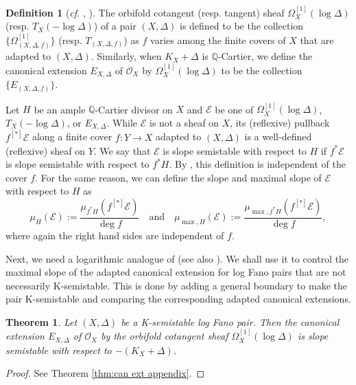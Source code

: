 \documentclass[12pt]{amsart}
\newtheorem{thm}[prop]{Theorem}
\theoremstyle{definition}
\newtheorem{defn}[prop]{Definition}
\newcommand{\bQ}{\mathbb{Q}}
\newcommand{\cO}{\mathcal{O}}
\newcommand{\cE}{\mathcal{E}}
\numberwithin{equation}{section}
\begin{document}
\begin{defn}[{\emph{cf.} \cite[Definition 2.23]{GT-orbifold-stab}, \cite[Example 2.21]{Dai-MY}}] \label{def:orbifold slope}
The orbifold cotangent (resp. tangent) sheaf $\Omega^{[1]}_X(\log \Delta)$ (resp. $T_X(-\log \Delta)$) of a pair $(X,\Delta)$ is defined to be the collection $\{\Omega^{[1]}_{(X,\Delta,f)}\}$ (resp. $T_{(X,\Delta,f)}$) as $f$ varies among the finite covers of $X$ that are adapted to $(X,\Delta)$. Similarly, when $K_X+\Delta$ is $\bQ$-Cartier, we define the canonical extension $E_{X,\Delta}$ of $\cO_X$ by $\Omega^{[1]}_X(\log \Delta)$ to be the collection $\{E_{(X,\Delta,f)}\}$. 

Let $H$ be an ample $\bQ$-Cartier divisor on $X$ and $\cE$ be one of $\Omega^{[1]}_X(\log \Delta)$, $T_X(-\log \Delta)$, or $E_{X,\Delta}$. While $\cE$ is not a sheaf on $X$, its (reflexive) pullback $f^{[*]}\cE$ along a finite cover $f\colon Y\to X$ adapted to $(X,\Delta)$ is a well-defined (reflexive) sheaf on $Y$. We say that $\cE$ is slope semistable with respect to $H$ if $f^*\cE$ is slope semistable with respect to $f^*H$. By \cite[Lemma 3.2.2]{HL-book-sheaf}, this definition is independent of the cover $f$. For the same reason, we can define the slope and maximal slope of $\cE$ with respect to $H$ as
\[
\mu_{H}(\cE):=\frac{\mu_{f^*H}(f^{[*]}\cE)}{\deg f}\quad \mathrm{and}\quad\mu_{\max,H}(\cE):=\frac{\mu_{\max,f^*H}(f^{[*]}\cE)}{\deg f},
\]
where again the right hand sides are independent of $f$.
\end{defn}

Next, we need a logarithmic analogue of \cite{DGP-Q-Fano-decomp} (see also \cite{Li-extension-stab,Dai-stability}). We shall use it to control the maximal slope of the adapted canonical extension for log Fano pairs that are not necessarily K-semistable. This is done by adding a general boundary to make the pair K-semistable and comparing the corresponding adapted canonical extensions. 

\begin{thm} \label{thm:can ext ss}
Let $(X,\Delta)$ be a K-semistable log Fano pair. Then the canonical extension $E_{X,\Delta}$ of $\cO_X$ by the orbifold cotangent sheaf $\Omega^{[1]}_X(\log \Delta)$ is slope semistable with respect to $-(K_X+\Delta)$.
\end{thm}

\begin{proof}
See Theorem \ref{thm:can ext appendix}.
\end{proof}
\end{document}
